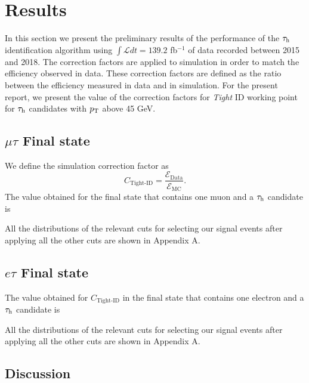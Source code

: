 \chapter{Results}\label{chap5}
In this section we present the preliminary results of the performance of the $\tau_\text{h}$ identification algorithm using $\int\mathcal{L} dt=139.2$ fb$^{-1}$ of data recorded between 2015 and 2018.
The correction factors are applied to simulation in order to match the efficiency observed in data. These correction factors are defined as the ratio between the efficiency measured in data and in simulation. For the present report, we present the value of the correction factors for \textit{Tight} ID working point for $\tau_\text{h}$ candidates with $p_\text{T}$ above 45 GeV.

\section{$\mu\tau$ Final state}
We define the simulation correction factor as
\begin{equation}
	C_{\text{Tight-ID}}=\frac{\mathcal{E}_{\text{Data}}}{\mathcal{E}_{\text{MC}}}.
\end{equation}
The value obtained for the final state that contains one muon and a $\tau_\text{h}$ candidate is

All the distributions of the relevant cuts for selecting our signal events after applying all the other cuts are shown in Appendix A.
\section{$e\tau$ Final state}
The value obtained for $C_{\text{Tight-ID}}$ in the final state that contains one electron and a $\tau_\text{h}$ candidate is

All the distributions of the relevant cuts for selecting our signal events after applying all the other cuts are shown in Appendix A.
\section{Discussion}

